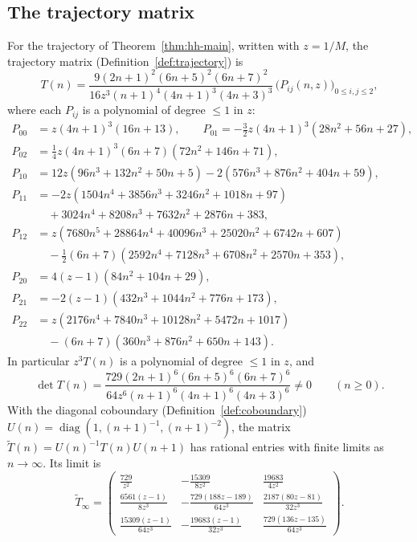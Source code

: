 \documentclass[oneside,english,11pt]{amsart}
\begin{document}
\subsection{The trajectory matrix}\label{app:hh-matrix}
For the trajectory of Theorem~\ref{thm:hh-main}, written with $z=1/M$, the trajectory
matrix (Definition~\ref{def:trajectory}) is
\begin{equation}\label{eq:hh-T}
 T(n)=\frac{9(2n+1)^2(6n+5)^2(6n+7)^2}{16z^3(n+1)^4(4n+1)^3(4n+3)^3}\,\bigl(P_{ij}(n,z)\bigr)_{0\le i,j\le2},
\end{equation}
where each $P_{ij}$ is a polynomial of degree $\le1$ in $z$:
\begin{align*}
 P_{00}&=z(4n+1)^3(16n+13),\qquad P_{01}=-\tfrac32z(4n+1)^3(28n^2+56n+27),\\
 P_{02}&=\tfrac14z(4n+1)^3(6n+7)(72n^2+146n+71),\\
 P_{10}&=12z(96n^3+132n^2+50n+5)-2(576n^3+876n^2+404n+59),\\
 P_{11}&=-2z(1504n^4+3856n^3+3246n^2+1018n+97)\\
       &\quad+3024n^4+8208n^3+7632n^2+2876n+383,\\
 P_{12}&=z(7680n^5+28864n^4+40096n^3+25020n^2+6742n+607)\\
       &\quad-\tfrac12(6n+7)(2592n^4+7128n^3+6708n^2+2570n+353),\\
 P_{20}&=4(z-1)(84n^2+104n+29),\\
 P_{21}&=-2(z-1)(432n^3+1044n^2+776n+173),\\
 P_{22}&=z(2176n^4+7840n^3+10128n^2+5472n+1017)\\
       &\quad-(6n+7)(360n^3+876n^2+650n+143).
\end{align*}
In particular $z^3T(n)$ is a polynomial of degree $\le1$ in $z$, and
\begin{equation}\label{eq:hh-detT}
 \det T(n)=\frac{729(2n+1)^6(6n+5)^6(6n+7)^6}{64z^6(n+1)^6(4n+1)^6(4n+3)^6}\ne0\qquad(n\ge0).
\end{equation}
With the diagonal coboundary (Definition~\ref{def:coboundary}) $U(n)=\operatorname{diag}(1,(n+1)^{-1},(n+1)^{-2})$, the matrix $\tilde T(n)=U(n)^{-1}T(n)U(n+1)$ has rational entries with finite limits as $n\to\infty$. Its limit is
\begin{equation}\label{eq:hh-Tinf}
 \tilde T_\infty=\begin{pmatrix}
 \frac{729}{z^2}&-\frac{15309}{8z^2}&\frac{19683}{4z^2}\\[2pt]
 \frac{6561(z-1)}{8z^3}&-\frac{729(188z-189)}{64z^3}&\frac{2187(80z-81)}{32z^3}\\[2pt]
 \frac{15309(z-1)}{64z^3}&-\frac{19683(z-1)}{32z^3}&\frac{729(136z-135)}{64z^3}
 \end{pmatrix}.
\end{equation}
\end{document}
